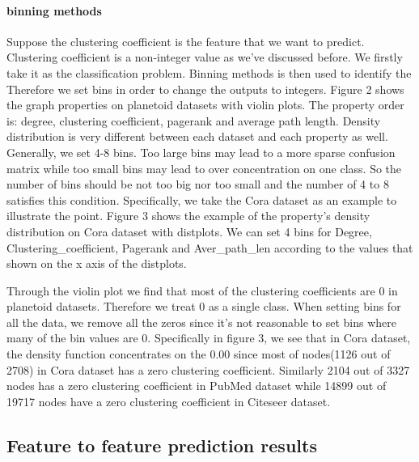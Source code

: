\documentclass[sigconf]{acmart}
\begin{document}
\paragraph{binning methods} Suppose the clustering coefficient is the feature that we want to predict. Clustering coefficient is a non-integer value as we've discussed before. We firstly take it as the classification problem. Binning methods is then used to identify the     Therefore we set bins in order to change the outputs to integers. Figure 2 shows the graph properties on planetoid datasets with violin plots. The property order is: degree, clustering coefficient, pagerank and average path length. Density distribution is very different between each dataset and each property as well. Generally, we set 4-8 bins. Too large bins may lead to a more sparse confusion matrix while too small bins may lead to over concentration on one class. So the number of bins should be not too big nor too small and the number of 4 to 8 satisfies this condition. Specifically, we take the Cora dataset as an example to illustrate the point. Figure 3 shows the example of the property's density distribution on Cora dataset with distplots. We can set 4 bins for Degree, Clustering\_coefficient, Pagerank and Aver\_path\_len according to the values that shown on the x axis of the distplots. 

Through the violin plot we find that most of the clustering coefficients are 0 in planetoid datasets. Therefore we treat 0 as a single class. When setting bins for all the data, we remove all the zeros since it's not reasonable to set bins where many of the bin values are 0. Specifically in figure 3, we see that in Cora dataset, the density function concentrates on the 0.00 since most of nodes(1126 out of 2708) in Cora dataset has a zero clustering coefficient. Similarly 2104 out of 3327 nodes has a zero clustering coefficient in PubMed dataset while 14899 out of 19717 nodes have a zero clustering coefficient in Citeseer dataset.








\subsection{Feature to feature prediction results}
\end{document}
